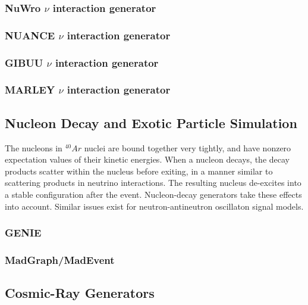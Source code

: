 \subsubsection{NuWro $\nu$ interaction generator}

\subsubsection{NUANCE $\nu$ interaction generator}

\subsubsection{GIBUU $\nu$ interaction generator}

\subsubsection{MARLEY $\nu$ interaction generator}

\subsection{Nucleon Decay and Exotic Particle Simulation}

The nucleons in $^{40}Ar$ nuclei are bound together very tightly, and have nonzero expectation values of their
kinetic energies.  When a nucleon decays, the decay products scatter within the nucleus before exiting, in a manner
similar to scattering products in neutrino interactions.  The resulting nucleus de-excites into a stable configuration
after the event.  Nucleon-decay generators take these effects into account.  Similar issues exist for neutron-antineutron
oscillaton signal models.

 
\subsubsection{GENIE}  %

\subsubsection{MadGraph/MadEvent}

\subsection{Cosmic-Ray Generators}

